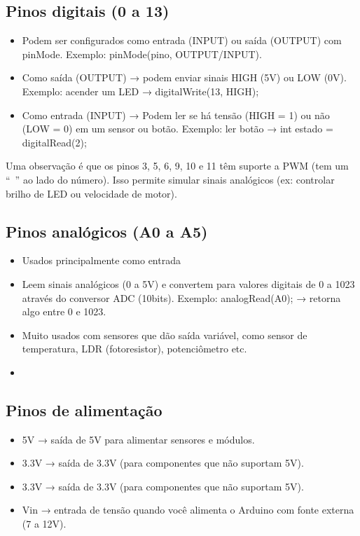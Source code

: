\documentclass{report}
\begin{document}
	\subsection{Pinos digitais (0 a 13)}
	\begin{itemize}
		\item Podem ser configurados como entrada (INPUT) ou saída (OUTPUT) com pinMode. Exemplo: pinMode(pino, OUTPUT/INPUT).
		\item Como saída (OUTPUT) → podem enviar sinais HIGH (5V) ou LOW (0V). Exemplo: acender um LED → digitalWrite(13, HIGH);
		\item  Como entrada (INPUT) → Podem ler se há tensão (HIGH = 1) ou não (LOW = 0) em um sensor ou botão. Exemplo: ler botão → int estado = digitalRead(2);
	\end{itemize}
	
	Uma observação é que os pinos 3, 5, 6, 9, 10 e 11 têm suporte a PWM (tem um “~” ao lado do número). Isso permite simular sinais analógicos (ex: controlar brilho de LED ou velocidade de motor).
	
	\subsection{Pinos analógicos (A0 a A5)}
	\begin{itemize}
		\item Usados principalmente como entrada
		\item Leem sinais analógicos (0 a 5V) e convertem para valores digitais de 0 a 1023 através do conversor ADC (10bits). Exemplo: analogRead(A0); → retorna algo entre 0 e 1023.
		\item Muito usados com sensores que dão saída variável, como sensor de temperatura, LDR (fotoresistor), potenciômetro etc.
		\item 
	\end{itemize}
	
	\subsection{Pinos de alimentação}
	\begin{itemize}
		\item 5V → saída de 5V para alimentar sensores e módulos.
		\item 3.3V → saída de 3.3V (para componentes que não suportam 5V).
		\item 3.3V → saída de 3.3V (para componentes que não suportam 5V).
		\item Vin → entrada de tensão quando você alimenta o Arduino com fonte externa (7 a 12V).
	\end{itemize}
	
\end{document}
